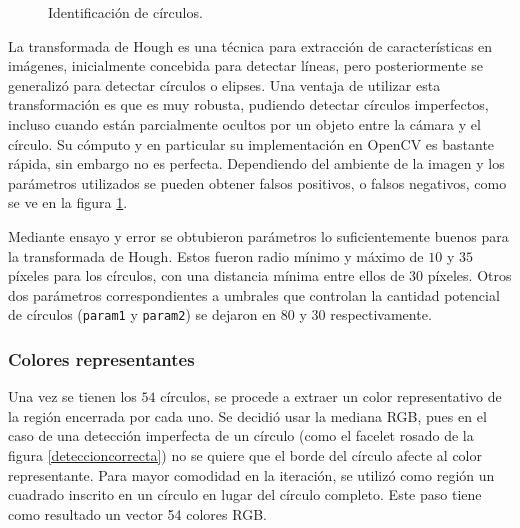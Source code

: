 \begin{figure}[h!]
	\centering
	\hfill
	\hfill
	\caption{Identificación de círculos.}
	\label{circulos}
\end{figure}

La transformada de Hough\cite{hough} es una técnica para extracción de características en imágenes, inicialmente concebida para detectar líneas, pero posteriormente se generalizó para detectar círculos o elipses. Una ventaja de utilizar esta transformación es que es muy robusta, pudiendo detectar círculos imperfectos, incluso cuando están parcialmente ocultos por un objeto entre la cámara y el círculo. Su cómputo y en particular su implementación en OpenCV es bastante rápida, sin embargo no es perfecta. Dependiendo del ambiente de la imagen y los parámetros utilizados se pueden obtener falsos positivos, o falsos negativos, como se ve en la figura \ref{circulos}.

Mediante ensayo y error se obtubieron parámetros lo suficientemente buenos para la transformada de Hough. Estos fueron radio mínimo y máximo de $10$ y $35$ píxeles para los círculos, con una distancia mínima entre ellos de $30$ píxeles. Otros dos parámetros correspondientes a umbrales que controlan la cantidad potencial de círculos (\texttt{param1} y \texttt{param2}) se dejaron en $80$ y $30$ respectivamente.

\subsubsection{Colores representantes}
Una vez se tienen los $54$ círculos, se procede a extraer un color representativo de la región encerrada por cada uno. Se decidió usar la mediana RGB, pues en el caso de una detección imperfecta de un círculo (como el facelet rosado de la figura \ref{deteccioncorrecta}) no se quiere que el borde del círculo afecte al color representante. Para mayor comodidad en la iteración, se utilizó como región un cuadrado inscrito en un círculo en lugar del círculo completo. Este paso tiene como resultado un vector 54 colores RGB.

